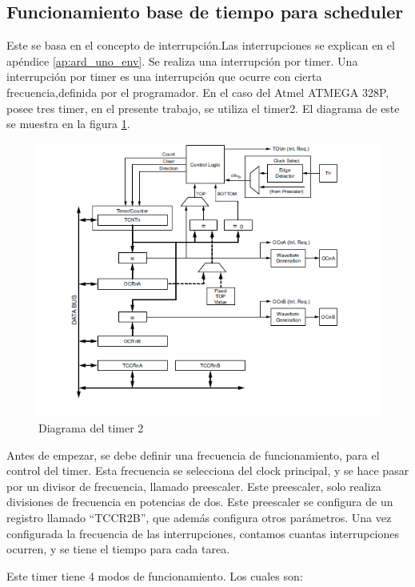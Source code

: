 \subsection{Funcionamiento base de tiempo para scheduler}

Este se basa en el concepto de interrupción.Las interrupciones se explican en el apéndice \ref{ap:ard_uno_env}. Se realiza una interrupción por timer. Una interrupción por timer es una interrupción que ocurre con cierta frecuencia,definida por el programador. En el caso del Atmel ATMEGA 328P, posee tres timer, en el presente trabajo, se utiliza el timer2. El diagrama de este se muestra en la figura \ref{fig:timer_2}. 

\begin{figure}[ht]
	\includegraphics{timer_2}
	\caption{Diagrama del timer 2 }
	\label{fig:timer_2}
\end{figure}


Antes de empezar, se debe definir una frecuencia de funcionamiento, para el control del timer. Esta frecuencia se selecciona del clock principal, y se hace pasar por un divisor de frecuencia, llamado preescaler. Este preescaler, solo realiza divisiones de frecuencia en potencias de dos. Este preescaler se configura de un registro llamado “TCCR2B”, que además configura otros parámetros. Una vez configurada la frecuencia de las interrupciones, contamos cuantas interrupciones ocurren, y se tiene el tiempo para cada tarea. 

Este timer tiene 4 modos de funcionamiento. Los cuales son:  


